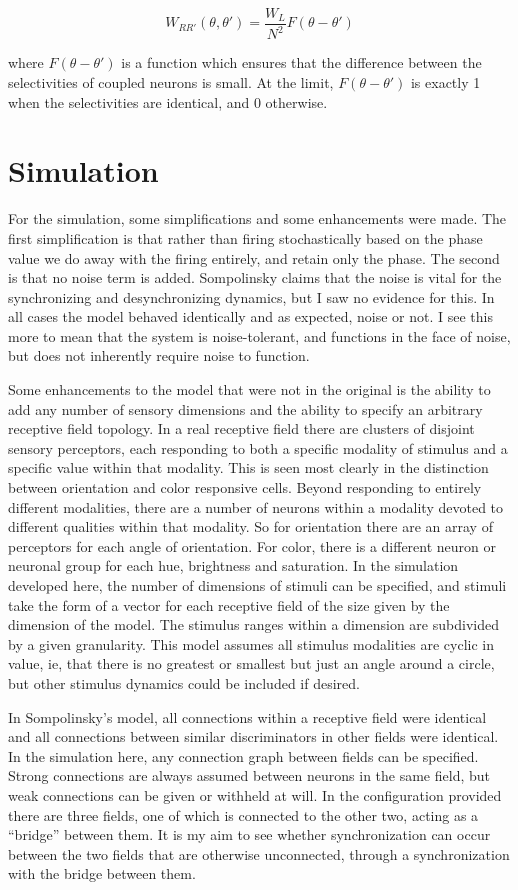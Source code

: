 \documentclass[12pt]{article}
\begin{document}
$$ W_{RR'}(\theta,\theta')=\frac{W_L}{N^2}F(\theta-\theta') $$

where $F(\theta-\theta')$ is a function which ensures that the difference between the selectivities of coupled neurons is small.  At the limit, $F(\theta-\theta')$ is exactly 1 when the selectivities are identical, and 0 otherwise.  

\section{Simulation}

For the simulation, some simplifications and some enhancements were made.  The first simplification is that rather than firing stochastically based on the phase value we do away with the firing entirely, and retain only the phase.  The second is that no noise term is added.  Sompolinsky claims that the noise is vital for the synchronizing and desynchronizing dynamics, but I saw no evidence for this.  In all cases the model behaved identically and as expected, noise or not.  I see this more to mean that the system is noise-tolerant, and functions in the face of noise, but does not inherently require noise to function.  

Some enhancements to the model that were not in the original is the ability to add any number of sensory dimensions and the ability to specify an arbitrary receptive field topology.  In a real receptive field there are clusters of disjoint sensory perceptors, each responding to both a specific modality of stimulus and a specific value within that modality.  This is seen most clearly in the distinction between orientation and color responsive cells.  Beyond responding to entirely different modalities, there are a number of neurons within a modality devoted to different qualities within that modality.  So for orientation there are an array of perceptors for each angle of orientation.  For color, there is a different neuron or neuronal group for each hue, brightness and saturation.  In the simulation developed here, the number of dimensions of stimuli can be specified, and stimuli take the form of a vector for each receptive field of the size given by the dimension of the model.  The stimulus ranges within a dimension are subdivided by a given granularity.  This model assumes all stimulus modalities are cyclic in value, ie, that there is no greatest or smallest but just an angle around a circle, but other stimulus dynamics could be included if desired.

In Sompolinsky's model, all connections within a receptive field were identical and all connections between similar discriminators in other fields were identical.  In the simulation here, any connection graph between fields can be specified.  Strong connections are always assumed between neurons in the same field, but weak connections can be given or withheld at will.  In the configuration provided there are three fields, one of which is connected to the other two, acting as a ``bridge'' between them.  It is my aim to see whether synchronization can occur between the two fields that are otherwise unconnected, through a synchronization with the bridge between them.  
\end{document}
